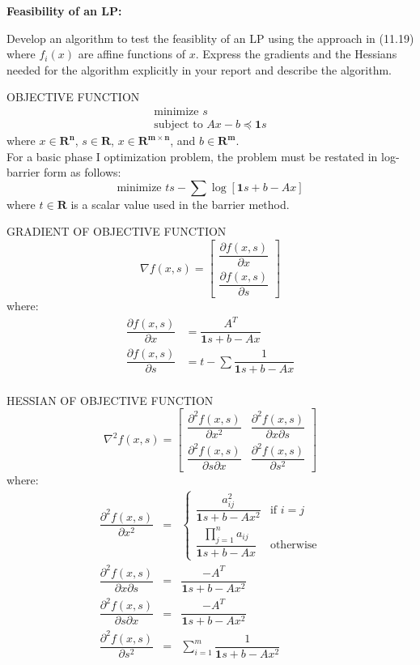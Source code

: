 \begin{prob}[4]\textbf{Feasibility of an LP:}
\end{prob}
 Develop an algorithm to test the feasiblity of an
  LP using the approach in (11.19) where $f_{i}(x)$ are affine functions
  of $x$. Express the gradients and the Hessians needed for the algorithm
  explicitly in your report and describe the algorithm.

OBJECTIVE FUNCTION
\begin{eqnarray*}
\mbox{minimize } s\\
\mbox{subject to } Ax - b \preccurlyeq \mathbf{1} s
\end{eqnarray*}
where $x \in \mathbf{R^{n}}$, $s \in \mathbf{R}$, $x \in \mathbf{R^{m \times n}}$, and  $b \in \mathbf{R^{m}}$.\\
For a basic phase I optimization problem, the problem must be restated in log-barrier form as follows:
\[
\mbox{minimize } ts - \sum \log [\mathbf{1}s + b - Ax]
\]
where $t \in \mathbf{R}$ is a scalar value used in the barrier method.

GRADIENT OF OBJECTIVE FUNCTION
\[
\nabla f(x, s) = \begin{bmatrix}
\dfrac{\partial f(x, s)}{\partial x}\\
\dfrac{\partial f(x, s)}{\partial s}
\end{bmatrix}
\]
where:
\begin{eqnarray*}
\dfrac{\partial f(x, s)}{\partial x} &= \dfrac{A^{T}}{\mathbf{1}s + b - Ax}\\
\dfrac{\partial f(x, s)}{\partial s} &= t - \sum \dfrac{1}{\mathbf{1}s + b - Ax}\\
\end{eqnarray*}

HESSIAN OF OBJECTIVE FUNCTION
\[
\nabla^{2} f(x, s) = \begin{bmatrix}
\dfrac{\partial^{2} f(x, s)}{\partial x^{2}} & \dfrac{\partial^{2} f(x, s)}{\partial x \partial s}\\
\dfrac{\partial^{2} f(x, s)}{\partial s \partial x} & \dfrac{\partial^{2} f(x, s)}{\partial s^{2}}
\end{bmatrix}
\]
where:
\begin{eqnarray*}
\dfrac{\partial^{2} f(x, s)}{\partial x^{2}} &=& \begin{cases}
\dfrac{a^{2}_{ij}}{\mathbf{1}s + b - Ax^{2}} & \mbox{if } i = j\\
\dfrac{\prod_{j=1}^{n}a_{ij}}{\mathbf{1}s + b - Ax} & \mbox{otherwise}
\end{cases}\\ 
\dfrac{\partial^{2} f(x, s)}{\partial x \partial s} &=& \dfrac{-A^{T}}{\mathbf{1}s + b - Ax^{2}}\\
\dfrac{\partial^{2} f(x, s)}{\partial s \partial x} &=& \dfrac{-A^{T}}{\mathbf{1}s + b - Ax^{2}}\\
\dfrac{\partial^{2} f(x, s)}{\partial s^{2}} &=& \sum_{i=1}^{m} \dfrac{1}{\mathbf{1}s + b - Ax^{2}}
\end{eqnarray*}


